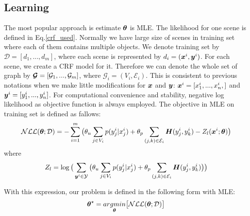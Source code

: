 \subsection{Learning}
The most popular approach is estimate $\boldsymbol \theta$ is \gls{MLE}. The likelihood for one scene is defined in Eq.\ref{crf_used}. Normally we have large size of scenes in training set where each of them contains multiple objects. We denote training set by $\mathcal{D} = [d_1, ..., d_m]$, where each scene is represented by $d_i = (\boldsymbol x^i, \boldsymbol y^i)$. For each scene, we create a \gls{CRF} model for it. Therefore we can denote the whole set of graph by $\boldsymbol{\mathcal{G}}=[\mathcal{G}_1, ..., \mathcal{G}_m]$, where $\mathcal{G}_i = (V_i, \mathcal{E}_i)$. This is consistent to previous notations when we make little modifications for $\boldsymbol x$ and $\boldsymbol y$: $\boldsymbol x^i = [x^i_1, ..., x^i_n,]$ and $\boldsymbol y^i = [y^i_1, ..., y^i_n]$. For computational convenience and stability, negative log likelihood as objective function is always employed. The objective in \gls{MLE} on training set is defined as fallows:
\begin{equation}
\label{crf_obj}
\mathcal{NLL}(\boldsymbol \theta; \mathcal{D}) = -\sum_{i=1}^{m}\big(\theta_u\sum_{j\in V_i} p(y_j^i|x_j^i) + \theta_p\sum_{(j,k)\in\mathcal{E}_i}\boldsymbol H(y_j^i, y_k^i)  - Z_l(\boldsymbol x^i; \boldsymbol \theta)\big)
\end{equation}     
where 
\begin{equation}
\label{log_partition_func}
Z_l = \log
\big(
\sum_{\boldsymbol y^i \in \mathcal{Y}} 
\big( 
\theta_u\sum_{j\in V_i}p(y_j^i|x_j^i) + \theta_p\sum_{(j,k)\in \mathcal{E}_i}\boldsymbol H(y_j^i, y_k^i) 
\big) 
\big)
\end{equation}

With this expression, our problem is defined in the following form with \gls{MLE}:
\begin{equation}
\label{crf_nll_opt}
\boldsymbol \theta^\star = \underset{{\boldsymbol \theta}}{argmin} \big[\mathcal{NLL(\boldsymbol \theta; \mathcal{D})}\big]
\end{equation}

